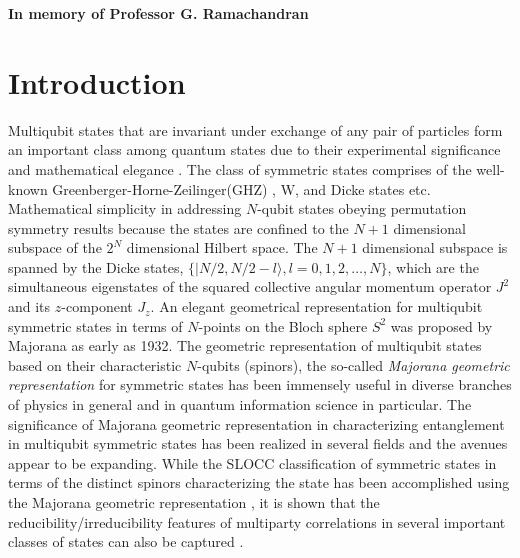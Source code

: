 \begin{center}
\textbf{\Large In memory of Professor G. Ramachandran}
\end{center}

\renewcommand{\thesection}{\Roman{section}}
\section{Introduction}\label{chap29-sec1}

Multiqubit states that are invariant under exchange of any pair of particles form an important class among quantum states due to their experimental significance and mathematical elegance \cite{sym1,sym1a,sym1b,sym2,sym3}. The class of symmetric states comprises of the well-known Greenberger-Horne-Zeilinger(GHZ) \cite{ghz}, W, and Dicke states \cite{dicke} etc. Mathematical simplicity in addressing $N$-qubit  states obeying permutation symmetry results because the states are confined to the $N+1$ dimensional subspace of the $2^N$ dimensional Hilbert space. The $N+1$ dimensional subspace is spanned by the Dicke states, $\{\vert N/2, N/2-l\rangle,  l=0,1,2,\ldots,N\}$, which are the simultaneous eigenstates of the squared collective angular momentum operator $J^2$ and its $z$-component $J_z$. An elegant geometrical representation for  multiqubit symmetric states in terms of $N$-points on the Bloch sphere $S^2$ was proposed by Majorana \cite{majorana} as early as 1932. The geometric representation of multiqubit states based on their characteristic $N$-qubits (spinors), the so-called {\em Majorana geometric representation} for symmetric states \cite{majorana,1945,makela} has been  immensely useful in diverse branches of physics \cite{1945,jpa4,arxiv4,jpa5,ejtp6} in general and in quantum information science \cite{solano, mixed, usa, usa1,usa2,usa3,markham1,markham2,gebastin,markham3} in particular.  The significance of Majorana geometric representation in characterizing entanglement in multiqubit symmetric states has been realized in several fields and the avenues appear to be expanding. While the SLOCC classification of symmetric states in terms of the distinct spinors characterizing the state has been accomplished using the Majorana geometric representation \cite{solano, mixed}, it is shown that the reducibility/irreducibility features of multiparty correlations in several important classes of states can also be captured \cite{usa1,usa2,usa}. 

